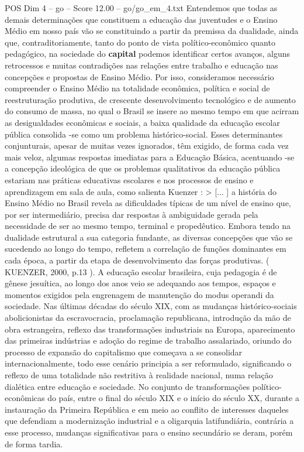 \begin{textsample}{POS Dim 4 – go – Score 12.00 – go/go\_em\_4.txt}
Entendemos que todas as demais determinações que constituem a educação das juventudes e o Ensino Médio em nosso país vão se constituindo a partir da premissa da dualidade, ainda que, contraditoriamente, tanto do ponto de vista político-econômico quanto pedagógico, na sociedade do \textbf{capital} podemos identificar certos avanços, alguns retrocessos e muitas contradições nas relações entre trabalho e educação nas concepções e propostas de Ensino Médio.
Por isso, consideramos necessário compreender o Ensino Médio na totalidade econômica, política e social de reestruturação produtiva, de crescente desenvolvimento tecnológico e de aumento do consumo de massa, no qual o Brasil se insere ao mesmo tempo em que acirram as desigualdades econômicas e sociais, a baixa qualidade da educação escolar pública consolida -se como um problema histórico-social.
Esses determinantes conjunturais, apesar de muitas vezes ignorados, têm exigido, de forma cada vez mais veloz, algumas respostas imediatas para a Educação Básica, acentuando -se a concepção ideológica de que os problemas qualitativos da educação pública estariam nas práticas educativas escolares e nos processos de ensino e aprendizagem em sala de aula, como salienta Kuenzer : > [... ] a história do Ensino Médio no Brasil revela as dificuldades típicas de um nível de ensino que, por ser intermediário, precisa dar respostas à ambiguidade gerada pela necessidade de ser ao mesmo tempo, terminal e propedêutico.
Embora tendo na dualidade estrutural a sua categoria fundante, as diversas concepções que vão se sucedendo ao longo do tempo, refletem a correlação de funções dominantes em cada época, a partir da etapa de desenvolvimento das forças produtivas. ( KUENZER, 2000, p.13 ).
A educação escolar brasileira, cuja pedagogia é de gênese jesuítica, ao longo dos anos veio se adequando aos tempos, espaços e momentos exigidos pela engrenagem de manutenção do modus operandi da sociedade.
Nas últimas décadas do século XIX, com as mudanças histórico-sociais abolicionistas da escravocracia, proclamação republicana, introdução da mão de obra estrangeira, reflexo das transformações industriais na Europa, aparecimento das primeiras indústrias e adoção do regime de trabalho assalariado, oriundo do processo de expansão do capitalismo que começava a se consolidar internacionalmente, todo esse cenário principia a ser reformulado, significando o reflexo de uma totalidade não restritiva à realidade nacional, numa relação dialética entre educação e sociedade.
No conjunto de transformações político-econômicas do país, entre o final do século XIX e o início do século XX, durante a instauração da Primeira República e em meio ao conflito de interesses daqueles que defendiam a modernização industrial e a oligarquia latifundiária, contrária a esse processo, mudanças significativas para o ensino secundário se deram, porém de forma tardia.

\end{textsample}
